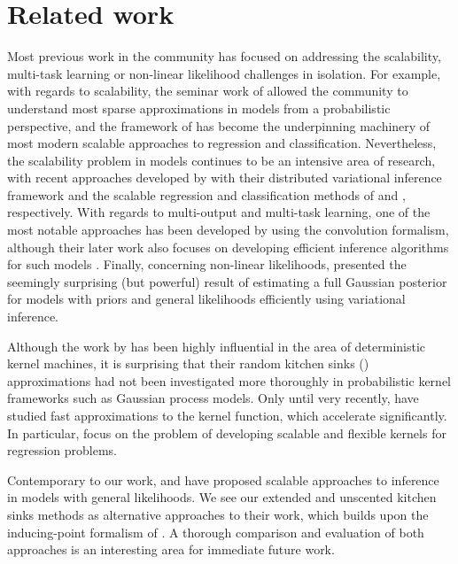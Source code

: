 \section{Related work}
Most previous work in the \gp community has focused on addressing  
the scalability, multi-task learning or non-linear likelihood challenges in
isolation. For example, with regards to scalability, the seminar work of \citet{quinonero2005unifying} allowed the 
community to understand most sparse approximations in \gp models from a probabilistic perspective, 
 and the   framework of \citet{titsias2009variational} has become the  underpinning  machinery
 of  most modern scalable approaches to \gp regression and classification.  
 Nevertheless, the scalability 
 problem in \gp models continues to be an intensive area of research, with recent approaches developed 
by \citet{yang-et-al-aistats-2015} with their distributed variational inference framework and 
 the scalable \gp regression and classification methods of 
 \citet{hensmangaussian} and  \citet{hensman-et-al-aistats-2015}, respectively. 
 With regards to multi-output and multi-task learning,  one of the most notable approaches has 
 been developed by  \citet{alvarez-lawrence-nips-08} using the convolution formalism, although 
 their later work also focuses on developing efficient inference algorithms for such models
\citep{alvarez2011computationally}.
%
 Finally, concerning non-linear likelihoods, \citet{opper-arch-nc-2009} presented 
 the seemingly surprising (but powerful) result of estimating a full Gaussian posterior 
for models with \gp priors and general \iid  likelihoods efficiently using variational inference.  
 
Although the work by \citet{rahimi-recht-nips-2007,rahimi-recht-nips-2008} has been highly 
influential in the area of deterministic kernel machines, it is surprising that their 
random kitchen sinks (\rks) approximations had not been investigated more 
thoroughly in probabilistic kernel frameworks 
such as Gaussian process models. Only until very recently, \citet{yang-et-al-aistats-2015} 
have studied fast approximations to the kernel function, which accelerate \rks significantly. 
In particular,  \citet{yang-et-al-aistats-2015}  focus on the problem of developing scalable 
and flexible kernels for regression problems. 

Contemporary to our work,  \citet{hensman-et-al-nips-2015} and \citet{dezfouli-bonilla-nips-2015}   
have  proposed scalable approaches to inference in \gp models with general likelihoods. 
We see our extended and unscented kitchen sinks methods as alternative approaches to their
work, which builds upon the inducing-point formalism of \citet{titsias2009variational}.
A thorough comparison and evaluation of both approaches is  an interesting 
area for immediate future work.

 